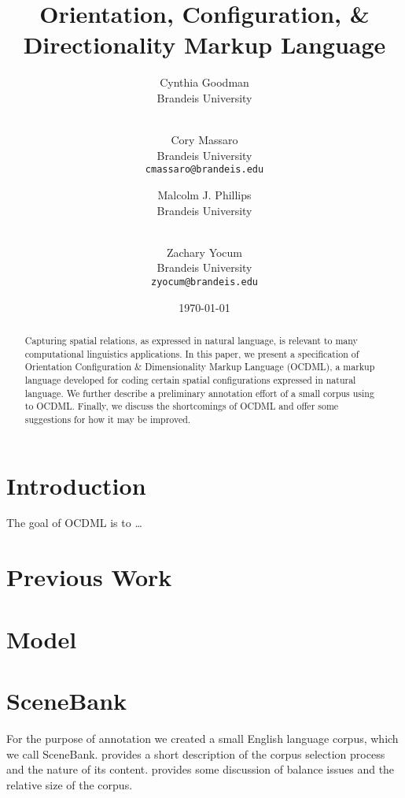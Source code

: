 \documentclass[11pt]{article}
\title{Orientation, Configuration, \& Directionality Markup Language}
\author{
    Cynthia Goodman \\
    Brandeis University \\
    \textt{cpg@brandeis.edu} \\
    \and
    Cory Massaro \\
    Brandeis University \\
    \texttt{cmassaro@brandeis.edu} \\
    \and
    Malcolm J. Phillips \\
    Brandeis University \\
    \textt{icos@brandeis.edu} \\
    \and
    Zachary Yocum \\
    Brandeis University \\
    \texttt{zyocum@brandeis.edu} 
}
\date{\today}
\begin{document}

\begin{abstract}
    Capturing spatial relations, as expressed in natural language, is relevant
    to many computational linguistics applications. In this paper, we present a
    specification of Orientation Configuration \& Dimensionality Markup
    Language (OCDML), a markup language developed for coding certain spatial
    configurations expressed in natural language. We further describe a
    preliminary annotation effort of a small corpus using to OCDML. Finally, we
    discuss the shortcomings of OCDML and offer some suggestions for how it may
    be improved.
\end{abstract}

\section{Introduction} %
\label{sec:introduction}
The goal of OCDML is to \ldots

\section{Previous Work} %
\label{sec:previous_work}


\section{Model} %
\label{sec:model}


\section{SceneBank} %
\label{scenebank_data}

For the purpose of annotation we created a small English language corpus, which we call SceneBank.  provides a short description of the corpus selection process and the nature of its content.  provides some discussion of balance issues and the relative size of the corpus.
\end{document}
